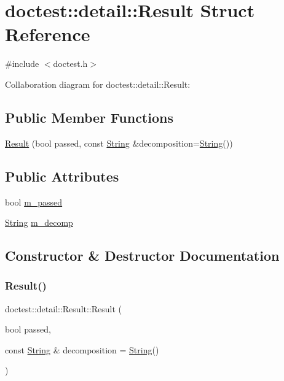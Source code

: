 \hypertarget{structdoctest_1_1detail_1_1Result}{}\section{doctest\+:\+:detail\+:\+:Result Struct Reference}
\label{structdoctest_1_1detail_1_1Result}


{\ttfamily \#include $<$doctest.\+h$>$}



Collaboration diagram for doctest\+:\+:detail\+:\+:Result\+:
\subsection*{Public Member Functions}
\begin{DoxyCompactItemize}
\item 
\hyperlink{structdoctest_1_1detail_1_1Result_ae4d2e8633aedaffa31f5c8b8530f522c}{Result} (bool passed, const \hyperlink{classdoctest_1_1String}{String} \&decomposition=\hyperlink{classdoctest_1_1String}{String}())
\end{DoxyCompactItemize}
\subsection*{Public Attributes}
\begin{DoxyCompactItemize}
\item 
bool \hyperlink{structdoctest_1_1detail_1_1Result_a03ff571186856a429ada967ddfdf3006}{m\+\_\+passed}
\item 
\hyperlink{classdoctest_1_1String}{String} \hyperlink{structdoctest_1_1detail_1_1Result_a97968e037266580a799ab3deb9365b79}{m\+\_\+decomp}
\end{DoxyCompactItemize}


\subsection{Constructor \& Destructor Documentation}
\mbox{\label{structdoctest_1_1detail_1_1Result_ae4d2e8633aedaffa31f5c8b8530f522c}} 
\subsubsection{\texorpdfstring{Result()}{Result()}}
{\footnotesize\ttfamily doctest\+::detail\+::\+Result\+::\+Result (\begin{DoxyParamCaption}\item[{bool}]{passed,  }\item[{const \hyperlink{classdoctest_1_1String}{String} \&}]{decomposition = {\ttfamily \hyperlink{classdoctest_1_1String}{String}()} }\end{DoxyParamCaption})}



